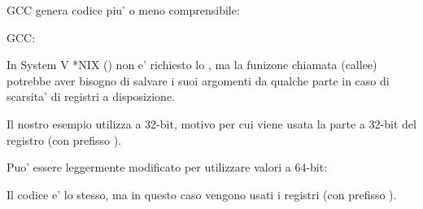 
\Optimizing GCC genera codice piu' o meno comprensibile:



\NonOptimizing GCC:




In System V *NIX (\SysVABI) non e' richiesto lo , ma la funizone chiamata (\gls{callee}) potrebbe aver bisogno di salvare
i suoi argomenti da qualche parte in caso di scarsita' di registri a disposizione.


Il nostro esempio utilizza \Tint a 32-bit, motivo per cui viene usata la parte a 32-bit del registro (con prefisso ).

Puo' essere leggermente modificato per utilizzare valori a 64-bit:





Il codice e' lo stesso, ma in questo caso vengono usati i registri  (con prefisso ).
